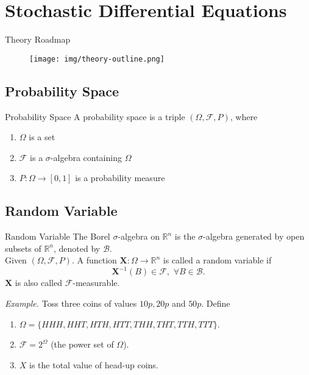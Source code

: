 \section{Stochastic Differential Equations}

\begin{frame}{Theory Roadmap}
    \begin{figure}
        \centering
        \texttt{[image: img/theory-outline.png]}
        \label{fig:enter-label}
    \end{figure}
\end{frame}

\subsection{Probability Space}

\begin{frame}{Probability Space}
A probability space is a triple $(\Omega, \mathcal{F}, P)$, where

\begin{enumerate}
    \item $\Omega$ is a set
    \item $\mathcal{F}$ is a $\sigma$-algebra containing $\Omega$
    \item $P:\Omega\to[0,1]$ is a probability measure
\end{enumerate}
\end{frame}

\subsection{Random Variable}

\begin{frame}{Random Variable}
The Borel $\sigma$-algebra on $\mathbb{R}^n$ is the $\sigma$-algebra generated by open subsets of $\mathbb{R}^n$, denoted by $\mathcal{B}$.\\
Given $(\Omega,\mathcal{F},P)$. A function $\mathbf{X}:\Omega\to\mathbb{R}^n$ is called a random variable if
$$\mathbf{X}^{-1}(B)\in\mathcal{F},\,\,\forall B\in\mathcal{B}.$$
$\mathbf{X}$ is also called $\mathcal{F}$-measurable.

\textit{Example.} Toss three coins of values $10p, 20p$ and $50p$. Define
\begin{enumerate}
    \item $\Omega=\{HHH,HHT,HTH,HTT,THH,THT,TTH,TTT\}$.
    \item $\mathcal{F}=2^\Omega$ (the power set of $\Omega$).
    \item $X$ is the total value of head-up coins.
\end{enumerate}
\end{frame}

